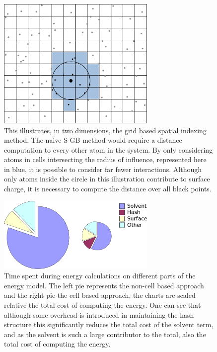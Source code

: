 \begin{figure}[H]
\begin{center}
\includegraphics[width=3in]{figures/grid4_crop.png}
\caption{This illustrates, in two dimensions, the grid based spatial indexing method.
The naive S-GB method would require a distance computation to every other atom in the system.
By only considering atoms in cells intersecting the radius of influence, represented here in blue, it is possible to consider far fewer interactions.
Although only atoms inside the circle in this illustration contribute to surface charge, it is necessary to compute the distance over all black points.}
\label{fig:grid_hash}
\end{center}
\end{figure}

\begin{figure}[H]
\begin{center}
\includegraphics[width=3in]{figures/side_by_side.png}
\caption{Time spent during energy calculations on different parts of the energy model.
The left pie represents the non-cell based approach and the right pie the cell based approach, the charts are scaled relative the total cost of computing the energy.
One can see that although some overhead is introduced in maintaining the hash structure this significantly reduces the total cost of the solvent term, and as the solvent is such a large contributor to the total, also the total cost of computing the energy.}
\label{fig:timing_pie}
\end{center}
\end{figure}

